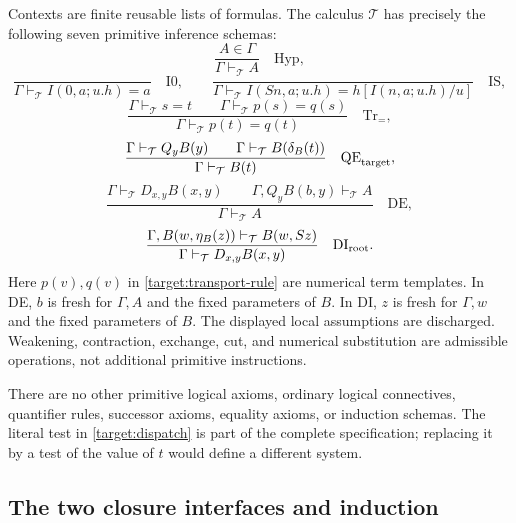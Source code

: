 \documentclass[11pt,a4paper]{article}
\theoremstyle{definition}\newtheorem{definition}[theorem]{Definition}
\begin{document}
Contexts are finite reusable lists of formulas.  The calculus $\mathcal T$
has precisely the following seven primitive inference schemas:
\[
 \frac{A\in\Gamma}{\Gamma\vdash_{\mathcal T}A}
 \quad\mathrm{Hyp},
\]
\[
 \frac{}{\Gamma\vdash_{\mathcal T}I(0,a;u.h)=a}
 \quad\mathrm{I0},
 \qquad
 \frac{}{\Gamma\vdash_{\mathcal T}
 I(Sn,a;u.h)=h[I(n,a;u.h)/u]}
 \quad\mathrm{IS},
\]
\begin{equation}
 \frac{\Gamma\vdash_{\mathcal T}s=t
       \qquad\Gamma\vdash_{\mathcal T}p(s)=q(s)}
      {\Gamma\vdash_{\mathcal T}p(t)=q(t)}
 \quad\mathrm{Tr}_{=},
 \label{target:transport-rule}
\end{equation}
\begin{equation}
 \frac{\Gamma\vdash_{\mathcal T}Q_yB(y)
       \qquad\Gamma\vdash_{\mathcal T}B(\delta_B(t))}
      {\Gamma\vdash_{\mathcal T}B(t)}
 \quad\mathrm{QE}_{\rm target},
 \label{target:elimination-rule}
\end{equation}
\begin{equation}
 \frac{\Gamma\vdash_{\mathcal T}D_{x,y}B(x,y)
       \qquad\Gamma,Q_yB(b,y)\vdash_{\mathcal T}A}
      {\Gamma\vdash_{\mathcal T}A}
 \quad\mathrm{DE},
 \label{target:de-rule}
\end{equation}
\begin{equation}
 \frac{\Gamma,B(w,\eta_B(z))\vdash_{\mathcal T}B(w,Sz)}
      {\Gamma\vdash_{\mathcal T}D_{x,y}B(x,y)}
 \quad\mathrm{DI}_{\rm root}.
 \label{target:di-rule}
\end{equation}
Here $p(v),q(v)$ in \eqref{target:transport-rule} are numerical term
templates.  In DE, $b$ is fresh for $\Gamma,A$ and the fixed parameters of
$B$.  In DI, $z$ is fresh for $\Gamma,w$ and the fixed parameters of $B$.
The displayed local assumptions are discharged.  Weakening, contraction,
exchange, cut, and numerical substitution are admissible operations, not
additional primitive instructions.

There are no other primitive logical axioms, ordinary logical connectives,
quantifier rules, successor axioms, equality axioms, or induction schemas.
The literal test in \eqref{target:dispatch} is part of the complete
specification; replacing it by a test of the value of $t$ would define a
different system.

\subsection{The two closure interfaces and induction}
\label{target:bootstrap}
\end{document}
